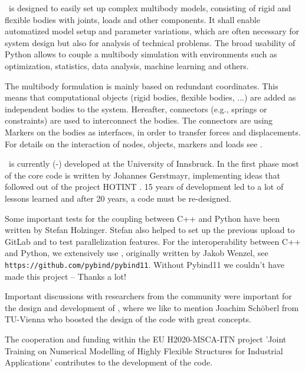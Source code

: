 \codeName\ is designed to easily set up complex multibody models, consisting of rigid and flexible bodies with joints, loads and other components. It shall enable automatized model setup and parameter variations, which are often necessary for system design but also for analysis of technical problems. The broad usability of Python allows to couple a multibody simulation with environments such as optimization, statistics, data analysis, machine learning and others.

The multibody formulation is mainly based on redundant coordinates. This means that computational objects (rigid bodies, flexible bodies, ...) are added as independent bodies to the system. Hereafter, connectors (e.g., springs or constraints) are used to interconnect the bodies. The connectors are using Markers on the bodies as interfaces, in order to transfer forces and displacements.
For details on the interaction of nodes, objects, markers and loads see .

\codeName\ is currently (\the\month-\the\year) developed at the University of Innsbruck.
In the first phase most of the core code is written by Johannes Gerstmayr, implementing ideas that followed out of the project HOTINT \cite{GerstmayrEtAl2013}. 15 years of development led to a lot of lessons learned and after 20 years, a code must be re-designed.

Some important tests for the coupling between C++ and Python have been written by Stefan Holzinger. Stefan also helped to set up the previous upload to GitLab and to test parallelization features.
For the interoperability between C++ and Python, we extensively use \cite{pybind11}, originally written by Jakob Wenzel, see \texttt{https://github.com/pybind/pybind11}. Without Pybind11 we couldn't have made this project -- Thanks a lot!

Important discussions with researchers from the community were important for the design and development of \codeName , where we like to mention Joachim Sch{\"o}berl from TU-Vienna who boosted the design of the code with great concepts. 

The cooperation and funding within the EU H2020-MSCA-ITN project 'Joint Training on Numerical Modelling of Highly Flexible Structures for Industrial Applications' contributes to the development of the code.


